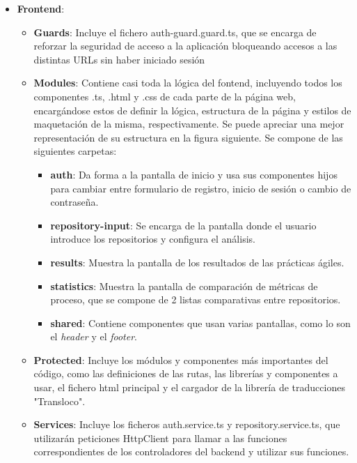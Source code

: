 \begin{itemize}
    \item \textbf{Frontend}:
    \begin{itemize}
    	\item \textbf{Guards}: Incluye el fichero auth-guard.guard.ts, que se encarga de reforzar la seguridad de acceso a la aplicación bloqueando accesos a las distintas URLs sin haber iniciado sesión
    	\item \textbf{Modules}: Contiene casi toda la lógica del fontend, incluyendo todos los componentes .ts, .html y .css de cada parte de la página web, encargándose estos de definir la lógica, estructura de la página y estilos de maquetación de la misma, respectivamente. Se puede apreciar una mejor representación de su estructura en la figura siguiente. Se compone de las siguientes carpetas:
            \begin{itemize}
                \item \textbf{auth}: Da forma a la pantalla de inicio y usa sus componentes hijos para cambiar entre formulario de registro, inicio de sesión o cambio de contraseña.
                \item \textbf{repository-input}: Se encarga de la pantalla donde el usuario introduce los repositorios y configura el análisis.
                \item \textbf{results}: Muestra la pantalla de los resultados de las prácticas ágiles.
                \item \textbf{statistics}: Muestra la pantalla de comparación de métricas de proceso, que se compone de 2 listas comparativas entre repositorios.
                \item \textbf{shared}: Contiene componentes que usan varias pantallas, como lo son el \textit{header} y el \textit{footer}.
            \end{itemize}
    	\item \textbf{Protected}: Incluye los módulos y componentes más importantes del código, como las definiciones de las rutas, las librerías y componentes a usar, el fichero html principal y el cargador de la librería de traducciones "Transloco".
    	\item \textbf{Services}: Incluye los ficheros auth.service.ts y repository.service.ts, que utilizarán peticiones HttpClient para llamar a las funciones correspondientes de los controladores del backend y utilizar sus funciones.
    \end{itemize}


\end{itemize}
